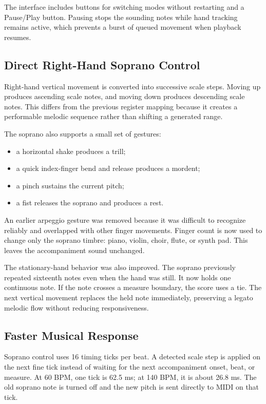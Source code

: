 \documentclass[11pt,a4paper]{article}
\begin{document}
The interface includes buttons for switching modes without restarting and a
Pause/Play button. Pausing stops the sounding notes while hand tracking remains
active, which prevents a burst of queued movement when playback resumes.

\subsection{Direct Right-Hand Soprano Control}

Right-hand vertical movement is converted into successive scale steps. Moving
up produces ascending scale notes, and moving down produces descending scale
notes. This differs from the previous register mapping because it creates a
performable melodic sequence rather than shifting a generated range.

The soprano also supports a small set of gestures:

\begin{itemize}
    \item a horizontal shake produces a trill;
    \item a quick index-finger bend and release produces a mordent;
    \item a pinch sustains the current pitch;
    \item a fist releases the soprano and produces a rest.
\end{itemize}

An earlier arpeggio gesture was removed because it was difficult to recognize
reliably and overlapped with other finger movements. Finger count is now used
to change only the soprano timbre: piano, violin, choir, flute, or synth pad.
This leaves the accompaniment sound unchanged.

The stationary-hand behavior was also improved. The soprano previously
repeated sixteenth notes even when the hand was still. It now holds one
continuous note. If the note crosses a measure boundary, the score uses a tie.
The next vertical movement replaces the held note immediately, preserving a
legato melodic flow without reducing responsiveness.

\subsection{Faster Musical Response}

Soprano control uses 16 timing ticks per beat. A detected scale step is applied
on the next fine tick instead of waiting for the next accompaniment onset,
beat, or measure. At 60 BPM, one tick is 62.5 ms; at 140 BPM, it is about
26.8 ms. The old soprano note is turned off and the new pitch is sent directly
to MIDI on that tick.
\end{document}
